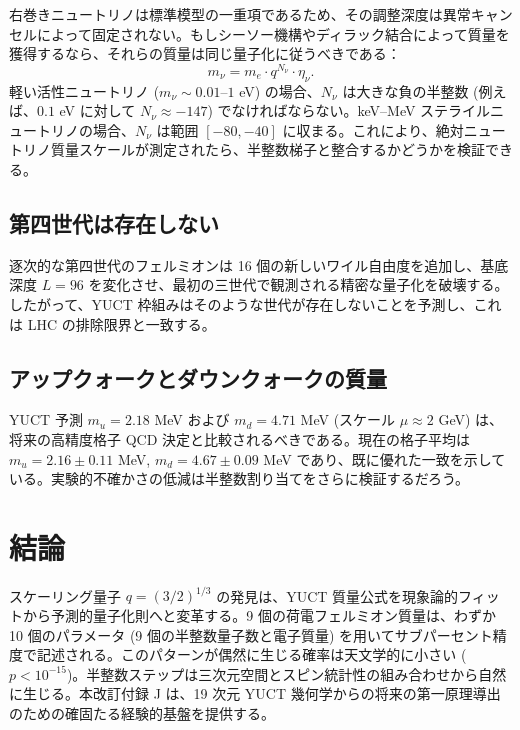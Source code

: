 \documentclass[12pt,a4paper]{article}
\begin{document}
	右巻きニュートリノは標準模型の一重項であるため、その調整深度は異常キャンセルによって固定されない。もしシーソー機構やディラック結合によって質量を獲得するなら、それらの質量は同じ量子化に従うべきである：
	\begin{equation}
		m_\nu = m_e \cdot q^{N_\nu} \cdot \eta_\nu.
	\end{equation}
	軽い活性ニュートリノ (\(m_\nu \sim 0.01\)–\(1\) eV) の場合、\(N_\nu\) は大きな負の半整数 (例えば、\(0.1\) eV に対して \(N_\nu \approx -147\)) でなければならない。keV–MeV ステライルニュートリノの場合、\(N_\nu\) は範囲 \([-80, -40]\) に収まる。これにより、絶対ニュートリノ質量スケールが測定されたら、半整数梯子と整合するかどうかを検証できる。
	
	\subsection{第四世代は存在しない}
	
	逐次的な第四世代のフェルミオンは 16 個の新しいワイル自由度を追加し、基底深度 \(L=96\) を変化させ、最初の三世代で観測される精密な量子化を破壊する。したがって、YUCT 枠組みはそのような世代が存在しないことを予測し、これは LHC の排除限界と一致する。
	
	\subsection{アップクォークとダウンクォークの質量}
	
	YUCT 予測 \(m_u = 2.18\) MeV および \(m_d = 4.71\) MeV (スケール \(\mu \approx 2\) GeV) は、将来の高精度格子 QCD 決定と比較されるべきである。現在の格子平均は \(m_u = 2.16 \pm 0.11\) MeV, \(m_d = 4.67 \pm 0.09\) MeV \cite{PDG2024} であり、既に優れた一致を示している。実験的不確かさの低減は半整数割り当てをさらに検証するだろう。
	
	\section{結論}
	
	スケーリング量子 \(q = (3/2)^{1/3}\) の発見は、YUCT 質量公式を現象論的フィットから予測的量子化則へと変革する。9 個の荷電フェルミオン質量は、わずか 10 個のパラメータ (9 個の半整数量子数と電子質量) を用いてサブパーセント精度で記述される。このパターンが偶然に生じる確率は天文学的に小さい (\(p < 10^{-15}\))。半整数ステップは三次元空間とスピン統計性の組み合わせから自然に生じる。本改訂付録 J は、19 次元 YUCT 幾何学からの将来の第一原理導出のための確固たる経験的基盤を提供する。
	
\end{document}
